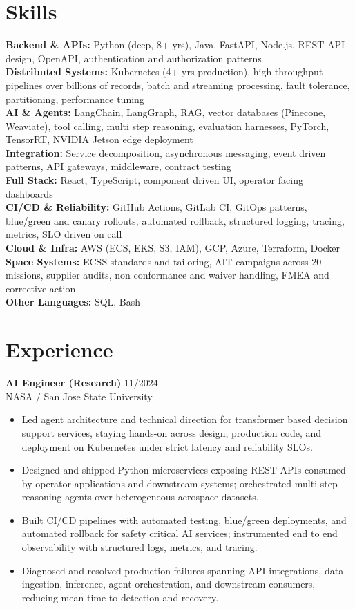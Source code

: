 \documentclass[a4paper,10pt]{article}
\begin{document}
\section*{Skills}
\textbf{Backend \& APIs:} Python (deep, 8+ yrs), Java, FastAPI, Node.js, REST API design, OpenAPI, authentication and authorization patterns \\
\textbf{Distributed Systems:} Kubernetes (4+ yrs production), high throughput pipelines over billions of records, batch and streaming processing, fault tolerance, partitioning, performance tuning \\
\textbf{AI \& Agents:} LangChain, LangGraph, RAG, vector databases (Pinecone, Weaviate), tool calling, multi step reasoning, evaluation harnesses, PyTorch, TensorRT, NVIDIA Jetson edge deployment \\
\textbf{Integration:} Service decomposition, asynchronous messaging, event driven patterns, API gateways, middleware, contract testing \\
\textbf{Full Stack:} React, TypeScript, component driven UI, operator facing dashboards \\
\textbf{CI/CD \& Reliability:} GitHub Actions, GitLab CI, GitOps patterns, blue/green and canary rollouts, automated rollback, structured logging, tracing, metrics, SLO driven on call \\
\textbf{Cloud \& Infra:} AWS (ECS, EKS, S3, IAM), GCP, Azure, Terraform, Docker \\
\textbf{Space Systems:} ECSS standards and tailoring, AIT campaigns across 20+ missions, supplier audits, non conformance and waiver handling, FMEA and corrective action \\
\textbf{Other Languages:} SQL, Bash

\section*{Experience}

\textbf{AI Engineer (Research)} \hfill 11/2024 \\
NASA / San Jose State University
\begin{itemize}
    \item Led agent architecture and technical direction for transformer based decision support services, staying hands-on across design, production code, and deployment on Kubernetes under strict latency and reliability SLOs.
    \item Designed and shipped Python microservices exposing REST APIs consumed by operator applications and downstream systems; orchestrated multi step reasoning agents over heterogeneous aerospace datasets.
    \item Built CI/CD pipelines with automated testing, blue/green deployments, and automated rollback for safety critical AI services; instrumented end to end observability with structured logs, metrics, and tracing.
    \item Diagnosed and resolved production failures spanning API integrations, data ingestion, inference, agent orchestration, and downstream consumers, reducing mean time to detection and recovery.
\end{itemize}
\end{document}
